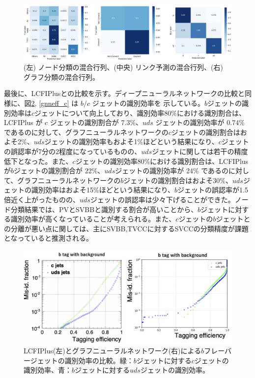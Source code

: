 \begin{figure}[H]
	\begin{center}
 \includegraphics[keepaspectratio, scale=0.3]
 	{Figure/Flavortagging/gnncm.png}
 		\caption{(左) ノード分類の混合行列、(中央) リンク予測の混合行列、(右) グラフ分類の混合行列。}
 		\label{gnncm}
	\end{center}
\end{figure}
最後に、LCFIPlusとの比較を示す。ディープニューラルネットワークの比較と同様に、図\ref{gnneff_b}, \ref{gnneff_c} は $b/c$ ジェットの識別効率を
示している。$b$ジェットの識別効率は$c$ジェットについて向上しており、識別効率80\%における識別割合は、LCFIPlus が $c$ ジェットの識別割合が 7.3\%、$uds$ ジェットの識別効率が 0.74\% であるのに対して、グラフニューラルネットワークの$c$ジェットの識別割合はおよそ2\%、$uds$ジェットの識別効率もおよそ1\%ほどという結果になり、$c$ジェットの誤認率が7分の2程度になっているものの、$uds$ジェットに関しては若干の精度低下となった。また、$c$ジェットの識別効率80\%における識別割合は、LCFIPlus が$b$ジェットの識別割合が 22\%、$uds$ジェットの識別効率が 24\% であるのに対して、グラフニューラルネットワークの$b$ジェットの識別割合はおよそ30\%、$uds$ジェットの識別効率はおよそ15\%ほどという結果になり、$b$ジェットの誤認率が1.5倍近く上がったものの、$uds$ジェットの誤認率は少々下げることができた。ノード分類結果では、PVとSVBBと識別する割合が高いことから、$b$ジェットに対する識別効率が高くなっていることが考えられる。また、$c$ジェットの$b$ジェットとの分離が悪い点に関しては、主にSVBB,TVCCに対するSVCCの分類精度が課題となっていると推測される。

\begin{figure}[H]
	\begin{center}
 \includegraphics[keepaspectratio, scale=0.33]
 	{Figure/Flavortagging/gnneff_b.png}
 		\caption{LCFIPlus(左)とグラフニューラルネットワーク(右)による$b$フレーバージェットの識別効率の比較。緑：$b$ジェットに対する$c$ジェットの識別効率、青：$b$ジェットに対する$uds$ジェットの識別効率。}
 		\label{gnneff_b}
	\end{center}
\end{figure}

